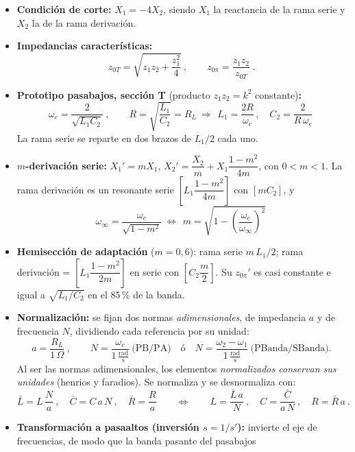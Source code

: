 \documentclass[class=article, crop=false, oneside]{standalone}
\begin{document}
\begin{itemize}\setlength{\itemsep}{2pt}
    \item \textbf{Condición de corte:} $X_1 = -4X_2$, siendo $X_1$ la reactancia
    de la rama serie y $X_2$ la de la rama derivación.
    \item \textbf{Impedancias características:}
    \[
        z_{0T} = \sqrt{z_1 z_2 + \frac{z_1^2}{4}}\ ,\qquad
        z_{0\pi} = \frac{z_1 z_2}{z_{0T}}\ .
    \]
    \item \textbf{Prototipo pasabajos, sección T} (producto $z_1 z_2 = k^2$ constante)\textbf{:}
    \[
        \omega_c = \frac{2}{\sqrt{L_1 C_2}}\ ,\qquad
        R = \sqrt{\frac{L_1}{C_2}} = R_L\ \Longrightarrow\
        \boxed{\,L_1 = \frac{2R}{\omega_c}\,,\quad C_2 = \frac{2}{R\,\omega_c}\,}
    \]
    La rama serie se reparte en dos brazos de $L_1/2$ cada uno.
    \item \textbf{$m$-derivación serie:} $X_1' = m X_1$,\;
    $X_2' = \dfrac{X_2}{m} + X_1\dfrac{1-m^2}{4m}$, con $0<m<1$. La rama
    derivación es un resonante serie $\left[L_1\dfrac{1-m^2}{4m}\right]$ con
    $\left[m C_2\right]$, y
    \[
        \omega_\infty = \frac{\omega_c}{\sqrt{1-m^2}}\ \Longleftrightarrow\
        \boxed{\,m = \sqrt{1-\left(\frac{\omega_c}{\omega_\infty}\right)^2}\,}
    \]
    \item \textbf{Hemisección de adaptación} ($m = 0{,}6$): rama serie
    $m\,L_1/2$; rama derivación = $\left[L_1\dfrac{1-m^2}{2m}\right]$ en serie con
    $\left[C_2\dfrac{m}{2}\right]$. Su $z_{0\pi}'$ es casi constante e igual a
    $\sqrt{L_1/C_2}$ en el 85\,\% de la banda.
    \item \textbf{Normalización:} se fijan dos normas \emph{adimensionales}, de
    impedancia $a$ y de frecuencia $N$, dividiendo cada referencia por su unidad:
    \[
        a = \frac{R_L}{1\,\Omega}\ ,\qquad
        N = \frac{\omega_c}{1\,\tfrac{\text{rad}}{\text{s}}}\ \text{(PB/PA)}\quad\text{ó}\quad
        N = \frac{\omega_2-\omega_1}{1\,\tfrac{\text{rad}}{\text{s}}}\ \text{(PBanda/SBanda)} .
    \]
    Al ser las normas adimensionales, los elementos \emph{normalizados conservan
    sus unidades} (henrios y faradios). Se normaliza y se desnormaliza con:
    \[
        \bar L = L\,\frac{N}{a}\ ,\quad \bar C = C\,a\,N\ ,\quad \bar R = \frac{R}{a}
        \qquad\Longleftrightarrow\qquad
        L = \frac{\bar L\,a}{N}\ ,\quad C = \frac{\bar C}{a\,N}\ ,\quad R = \bar R\,a\ .
    \]
    \item \textbf{Transformación a pasaaltos (inversión $s = 1/s'$):} invierte el
    eje de frecuencias, de modo que la banda pasante del pasabajos

\end{itemize}
\end{document}
